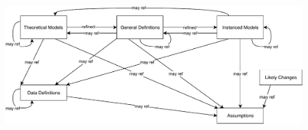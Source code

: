 \documentclass[12pt]{article}
\begin{document}





\begin{figure}[H]
  \includegraphics[scale=0.9]{RelationsBetweenTM_GD_IM_DD_A.pdf}
\end{figure}
\end{document}
